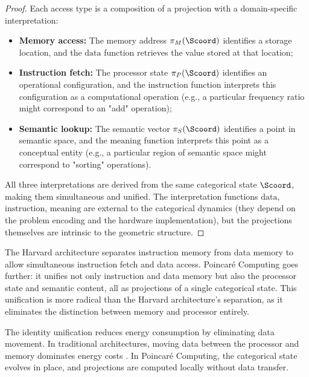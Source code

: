 \begin{proof}
Each access type is a composition of a projection with a domain-specific interpretation:
\begin{itemize}
    \item \textbf{Memory access:} The memory address $\pi_M(\Scoord)$ identifies a storage location, and the $\text{data}$ function retrieves the value stored at that location;
    \item \textbf{Instruction fetch:} The processor state $\pi_P(\Scoord)$ identifies an operational configuration, and the $\text{instruction}$ function interprets this configuration as a computational operation (e.g., a particular frequency ratio might correspond to an "add" operation);
    \item \textbf{Semantic lookup:} The semantic vector $\pi_S(\Scoord)$ identifies a point in semantic space, and the $\text{meaning}$ function interprets this point as a conceptual entity (e.g., a particular region of semantic space might correspond to "sorting" operations).
\end{itemize}

All three interpretations are derived from the same categorical state $\Scoord$, making them simultaneous and unified. The interpretation functions $\text{data}$, $\text{instruction}$, $\text{meaning}$ are external to the categorical dynamics (they depend on the problem encoding and the hardware implementation), but the projections themselves are intrinsic to the geometric structure.
\end{proof}

\begin{remark}
\label{rem:harvard_comparison}
The Harvard architecture \citep{harvard1944mark} separates instruction memory from data memory to allow simultaneous instruction fetch and data access. Poincaré Computing goes further: it unifies not only instruction and data memory but also the processor state and semantic content, all as projections of a single categorical state. This unification is more radical than the Harvard architecture's separation, as it eliminates the distinction between memory and processor entirely.
\end{remark}

\begin{proposition}
\label{prop:energy_efficiency}
The identity unification reduces energy consumption by eliminating data movement. In traditional architectures, moving data between the processor and memory dominates energy costs \citep{horowitz2014energy}. In Poincaré Computing, the categorical state evolves in place, and projections are computed locally without data transfer.
\end{proposition}

